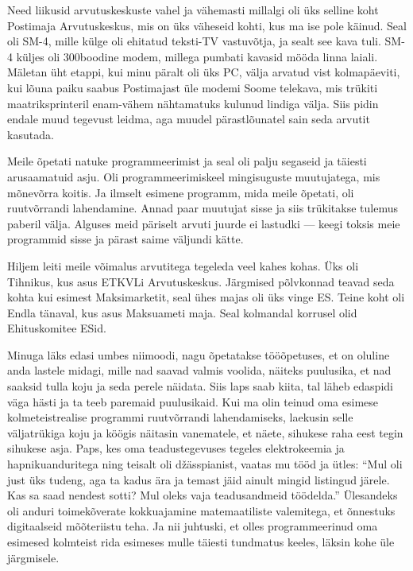 
Need liikusid arvutuskeskuste vahel ja vähemasti millalgi oli üks selline 
koht Postimaja Arvutuskeskus, mis on 
üks väheseid kohti, kus ma ise pole käinud. Seal oli SM-4, mille külge oli ehitatud teksti-TV 
vastuvõtja, 
ja sealt see kava tuli. SM-4 küljes oli 300boodine modem, millega 
pumbati kavasid mööda linna laiali. Mäletan üht
etappi, kui minu päralt oli üks PC, välja arvatud vist kolmapäeviti, 
kui lõuna paiku saabus Postimajast üle modemi Soome telekava, mis trükiti maatriksprinteril enam-vähem nähtamatuks kulunud lindiga välja. Siis 
pidin endale muud tegevust leidma, aga muudel pärastlõunatel sain seda 
arvutit kasutada.


Meile õpetati natuke programmeerimist ja seal oli palju segaseid ja 
täiesti arusaamatuid asju. Oli programmeerimiskeel mingisuguste muutujatega, 
mis mõnevõrra koitis. Ja ilmselt esimene programm, mida meile õpetati, oli ruutvõrrandi lahendamine. Annad paar muutujat sisse ja siis 
trükitakse tulemus paberil välja. Alguses meid 
päriselt arvuti juurde ei lastudki --- keegi toksis  meie 
programmid sisse ja pärast saime väljundi kätte. 

Hiljem leiti meile võimalus arvutitega tegeleda veel kahes kohas. Üks oli 
Tihnikus, kus asus ETKVLi Arvutuskeskus. Järgmised 
põlvkonnad teavad seda kohta kui esimest Maksimarketit, seal ühes majas oli üks 
vinge ES. Teine koht oli Endla tänaval, kus asus Maksuameti maja. Seal kolmandal 
korrusel olid Ehituskomitee ESid. 

Minuga läks edasi umbes niimoodi, nagu õpetatakse tööõpetuses, et on 
oluline anda lastele midagi, mille nad saavad valmis voolida, näiteks puulusika,
et nad saaksid tulla koju ja seda perele näidata. Siis laps saab kiita, tal läheb edaspidi väga 
hästi ja ta teeb paremaid puulusikaid. Kui ma olin teinud 
oma esimese kolmeteistrealise programmi ruutvõrrandi lahendamiseks, laekusin 
selle väljatrükiga koju ja köögis näitasin vanematele, et 
näete, sihukese raha eest tegin sihukese asja. Paps, kes oma 
teadustegevuses tegeles elektrokeemia ja hapnikuanduritega ning teisalt 
oli džässpianist, vaatas mu tööd ja ütles: \enquote{Mul oli 
just üks tudeng, aga ta kadus ära ja temast jäid ainult mingid listingud 
järele. Kas sa saad nendest sotti? Mul oleks vaja teadusandmeid 
töödelda.} Ülesandeks oli anduri toimekõverate kokkuajamine 
matemaatiliste valemitega, et õnnestuks digitaalseid mõõteriistu teha. Ja nii juhtuski, et olles programmeerinud oma 
esimesed kolmteist rida esimeses mulle täiesti tundmatus keeles, 
läksin kohe üle järgmisele.

